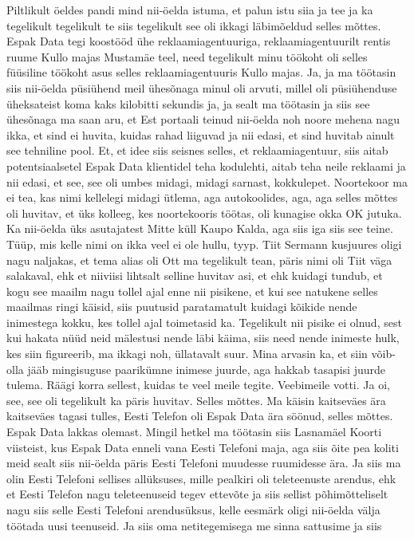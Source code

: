 Piltlikult öeldes pandi mind nii-öelda istuma, et palun istu siia ja tee ja ka tegelikult tegelikult te siis tegelikult see oli ikkagi läbimõeldud selles mõttes. Espak Data tegi koostööd ühe reklaamiagentuuriga, reklaamiagentuurilt rentis ruume Kullo majas Mustamäe teel, need tegelikult minu töökoht oli selles füüsiline töökoht asus selles reklaamiagentuuris Kullo majas. Ja, ja ma töötasin siis nii-öelda püsiühend meil ühesõnaga minul oli arvuti, millel oli püsiühenduse üheksateist koma kaks kilobitti sekundis ja, ja sealt ma töötasin ja siis see ühesõnaga ma saan aru, et Est portaali teinud nii-öelda noh noore mehena nagu ikka, et sind ei huvita, kuidas rahad liiguvad ja nii edasi, et sind huvitab ainult see tehniline pool. Et, et idee siis seisnes selles, et reklaamiagentuur, siis aitab potentsiaalsetel Espak Data klientidel teha kodulehti, aitab teha neile reklaami ja nii edasi, et see, see oli umbes midagi, midagi sarnast, kokkulepet. Noortekoor ma ei tea, kas nimi kellelegi midagi ütlema, aga autokoolides, aga, aga selles mõttes oli huvitav, et üks kolleeg, kes noortekooris töötas, oli kunagise okka
OK jutuka.
Ka nii-öelda üks asutajatest
Mitte küll Kaupo Kalda, aga siis iga siis see teine.
Tüüp, mis kelle nimi on ikka veel ei ole hullu, tyyp.
Tiit Sermann kusjuures oligi nagu naljakas, et tema alias oli Ott ma tegelikult tean, päris nimi oli Tiit väga salakaval, ehk et niiviisi lihtsalt selline huvitav asi, et ehk kuidagi tundub, et kogu see maailm nagu tollel ajal enne nii pisikene, et kui see natukene selles maailmas ringi käisid, siis puutusid paratamatult kuidagi kõikide nende inimestega kokku, kes tollel ajal toimetasid ka.
Tegelikult nii pisike ei olnud, sest kui hakata nüüd neid mälestusi nende läbi käima, siis need nende inimeste hulk, kes siin figureerib, ma ikkagi noh, üllatavalt suur. Mina arvasin ka, et siin võib-olla jääb mingisuguse paarikümne inimese juurde, aga hakkab tasapisi juurde tulema. Räägi korra sellest, kuidas te veel meile tegite. Veebimeile votti.
Ja oi, see, see oli tegelikult ka päris huvitav. Selles mõttes. Ma käisin kaitseväes ära kaitseväes tagasi tulles, Eesti Telefon oli Espak Data ära söönud, selles mõttes. Espak Data lakkas olemast. Mingil hetkel ma töötasin siis Lasnamäel Koorti viisteist, kus Espak Data enneli vana Eesti Telefoni maja, aga siis õite pea koliti meid sealt siis nii-öelda päris Eesti Telefoni muudesse ruumidesse ära. Ja siis ma olin Eesti Telefoni sellises allüksuses, mille pealkiri oli teleteenuste arendus, ehk et Eesti Telefon nagu teleteenuseid tegev ettevõte ja siis sellist põhimõtteliselt nagu siis selle Eesti Telefoni arendusüksus, kelle eesmärk oligi nii-öelda välja töötada uusi teenuseid. Ja siis oma netitegemisega me sinna sattusime ja siis
